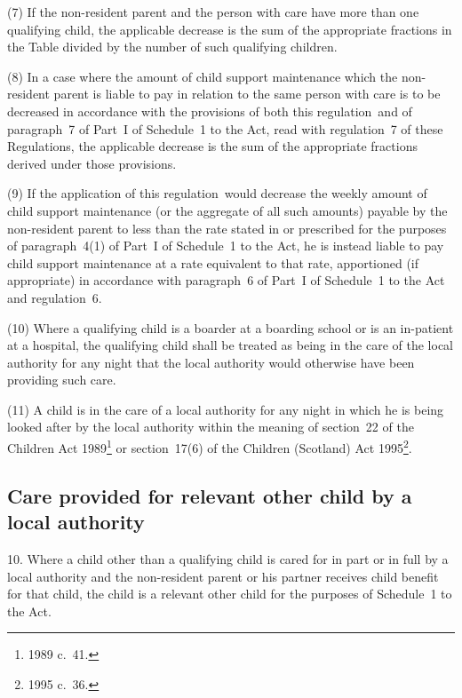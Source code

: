 \documentclass[12pt,a4paper]{article}
\begin{document}
(7) If the non-resident parent and the person with care have more than one qualifying child, the applicable decrease is the sum of the appropriate fractions in the Table divided by the number of such qualifying children.

(8) In a case where the amount of child support maintenance which the non-resident parent is liable to pay in relation to the same person with care is to be decreased in accordance with the provisions of both this regulation~and of paragraph~7 of Part~I of Schedule~1 to the Act, read with regulation~7 of these Regulations, the applicable decrease is the sum of the appropriate fractions derived under those provisions.

\begin{sloppypar}
(9) If the application of this regulation~would decrease the weekly amount of child support maintenance (or the aggregate of all such amounts) payable by the non-resident parent to less than the rate stated in or prescribed for the purposes of paragraph~4(1) of Part~I of Schedule~1 to the Act, he is instead liable to pay child support maintenance at a rate equivalent to that rate, apportioned (if appropriate) in accordance with paragraph~6 of Part~I of Schedule~1 to the Act and regulation~6.
\end{sloppypar}

(10) Where a qualifying child is a boarder at a boarding school or is an in-patient at a hospital, the qualifying child shall be treated as being in the care of the local authority for any night that the local authority would otherwise have been providing such care.

(11) A child is in the care of a local authority for any night in which he is being looked after by the local authority within the meaning of section~22 of the Children Act 1989\footnote{1989 c.\ 41.} or section~17(6) of the Children (Scotland) Act 1995\footnote{1995 c.\ 36.}.

\subsection[10. Care provided for relevant other child by a local authority]{Care provided for relevant other child by a local authority}

10.  Where a child other than a qualifying child is cared for in part or in full by a local authority and the non-resident parent or his partner receives child benefit for that child, the child is a relevant other child for the purposes of Schedule~1 to the Act.
\end{document}
